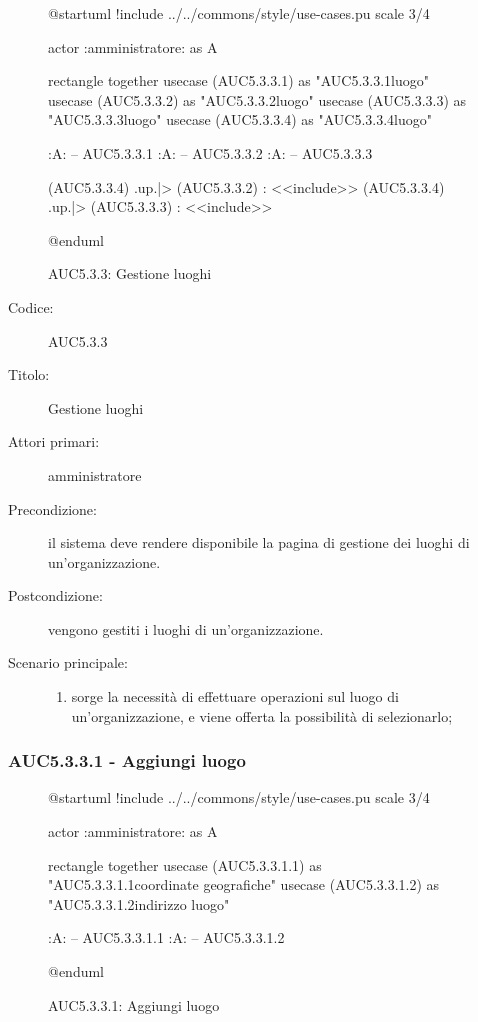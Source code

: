 \documentclass[../../../analisi-dei-requisiti.tex]{subfiles}
\begin{document}
\begin{figure}[h!]
  \centering
  \begin{plantuml}
  @startuml
  !include ../../commons/style/use-cases.pu
  scale 3/4

  actor :amministratore: as A

  rectangle {
    together {
      usecase (AUC5.3.3.1) as "AUC5.3.3.1\nAggiungi luogo"
      usecase (AUC5.3.3.2) as "AUC5.3.3.2\nEliminazione luogo"
      usecase (AUC5.3.3.3) as "AUC5.3.3.3\nModifica luogo"
    }
    usecase (AUC5.3.3.4) as "AUC5.3.3.4\nSeleziona luogo"
  }

  :A: -- AUC5.3.3.1
  :A: -- AUC5.3.3.2
  :A: -- AUC5.3.3.3

  (AUC5.3.3.4) .up.|> (AUC5.3.3.2) : <<include>>
  (AUC5.3.3.4) .up.|> (AUC5.3.3.3) : <<include>>

  @enduml
  \end{plantuml}
  \caption{AUC5.3.3: Gestione luoghi}
  \label{fig:AUC5_3_3}
\end{figure}

\begin{description}
  \item[Codice:] AUC5.3.3
  \item[Titolo:] Gestione luoghi
  \item[Attori primari:] amministratore
  \item[Precondizione:] il sistema deve rendere disponibile la pagina di gestione dei luoghi di un'organizzazione.
  \item[Postcondizione:] vengono gestiti i luoghi di un'organizzazione.
  \item[Scenario principale:]
  \begin{enumerate}
    \item sorge la necessità di effettuare operazioni sul luogo di un'organizzazione, e viene offerta la possibilità di selezionarlo;
  \end{enumerate}
\end{description}

\subsubsection{AUC5.3.3.1 - Aggiungi luogo}%
\label{subsub:AUC5.3.3.1}

\begin{figure}[h!]
  \centering
  \begin{plantuml}
  @startuml
  !include ../../commons/style/use-cases.pu
  scale 3/4

  actor :amministratore: as A

  rectangle {
    together {
      usecase (AUC5.3.3.1.1) as "AUC5.3.3.1.1\nInserisci coordinate geografiche"
      usecase (AUC5.3.3.1.2) as "AUC5.3.3.1.2\nInserisci indirizzo luogo"
    }
  }

  :A: -- AUC5.3.3.1.1
  :A: -- AUC5.3.3.1.2

  @enduml
  \end{plantuml}
  \caption{AUC5.3.3.1: Aggiungi luogo}
  \label{fig:AUC5_3_3_1}
\end{figure}
\end{document}

